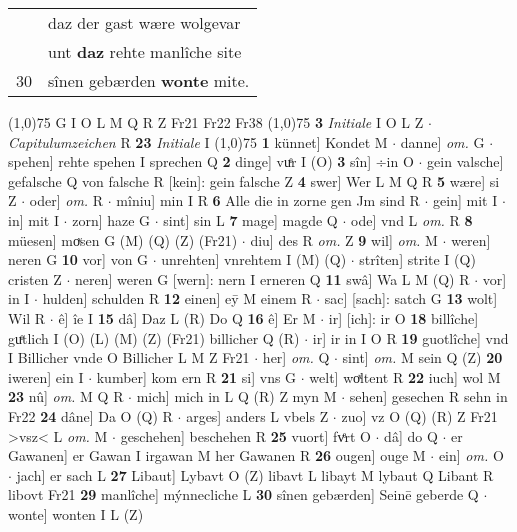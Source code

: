 \documentclass[8pt,a4paper,notitlepage]{article}
\begin{document}
\begin{table}[ht]
\begin{minipage}[t]{0.5\linewidth}
\begin{tabular}{rl}
 & daz der gast wære wolgevar\\ 
 & unt \textbf{daz} rehte manlîche site\\ 
30 & sînen gebærden \textbf{wonte} mite.\\ 
\end{tabular}
\scriptsize
\line(1,0){75} \newline
G I O L M Q R Z Fr21 Fr22 Fr38 \newline
\line(1,0){75} \newline
\textbf{3} \textit{Initiale} I O L Z   $\cdot$ \textit{Capitulumzeichen} R  \textbf{23} \textit{Initiale} I  \newline
\line(1,0){75} \newline
\textbf{1} künnet] Kondet M  $\cdot$ danne] \textit{om.} G  $\cdot$ spehen] rehte spehen I sprechen Q \textbf{2} dinge] vuͤr I (O) \textbf{3} sîn] ÷in O  $\cdot$ gein valsche] gefalsche Q von falsche R [kein]: gein falsche Z \textbf{4} swer] Wer L M Q R \textbf{5} wære] si Z  $\cdot$ oder] \textit{om.} R  $\cdot$ mîniu] min I R \textbf{6} Alle die in zorne gen Jm sind R  $\cdot$ gein] mit I  $\cdot$ in] mit I  $\cdot$ zorn] haze G  $\cdot$ sint] sin L \textbf{7} mage] magde Q  $\cdot$ ode] vnd L \textit{om.} R \textbf{8} müesen] moͮsen G (M) (Q) (Z) (Fr21)  $\cdot$ diu] des R \textit{om.} Z \textbf{9} wil] \textit{om.} M  $\cdot$ weren] neren G \textbf{10} vor] von G  $\cdot$ unrehten] vnrehtem I (M) (Q)  $\cdot$ strîten] strite I (Q) cristen Z  $\cdot$ neren] weren G [wern]: nern I erneren Q \textbf{11} swâ] Wa L M (Q) R  $\cdot$ vor] in I  $\cdot$ hulden] schulden R \textbf{12} einen] eȳ M einem R  $\cdot$ sac] [sach]: satch G \textbf{13} wolt] Wil R  $\cdot$ ê] îe I \textbf{15} dâ] Daz L (R) Do Q \textbf{16} ê] Er M  $\cdot$ ir] [ich]: ir O \textbf{18} billîche] guͤtlich I (O) (L) (M) (Z) (Fr21) billicher Q (R)  $\cdot$ ir] ir in I O R \textbf{19} guotlîche] vnd I Billicher vnde O Billicher L M Z Fr21  $\cdot$ her] \textit{om.} Q  $\cdot$ sint] \textit{om.} M sein Q (Z) \textbf{20} iweren] ein I  $\cdot$ kumber] kom ern R \textbf{21} si] vns G  $\cdot$ welt] woͯltent R \textbf{22} iuch] wol M \textbf{23} nû] \textit{om.} M Q R  $\cdot$ mich] mich in L Q (R) Z myn M  $\cdot$ sehen] gesechen R sehn in Fr22 \textbf{24} dâne] Da O (Q) R  $\cdot$ arges] anders L vbels Z  $\cdot$ zuo] vz O (Q) (R) Z Fr21 >vsz< L \textit{om.} M  $\cdot$ geschehen] beschehen R \textbf{25} vuort] fvͤrt O  $\cdot$ dâ] do Q  $\cdot$ er Gawanen] er Gawan I irgawan M her Gawanen R \textbf{26} ougen] ouge M  $\cdot$ ein] \textit{om.} O  $\cdot$ jach] er sach L \textbf{27} Libaut] Lybavt O (Z) libavt L libayt M lybaut Q Libant R libovt Fr21 \textbf{29} manlîche] mýnnecliche L \textbf{30} sînen gebærden] Seinē geberde Q  $\cdot$ wonte] wonten I L (Z) \newline

\end{minipage}
\end{table}
\end{document}

